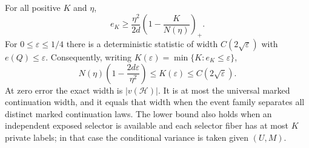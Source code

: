 \begin{theorem}\label{thm:v15-task}
For all positive $K$ and $\eta$,
\begin{equation}\label{eq:v15-task-packing}
 e_K\ge\frac{\eta^2}{2d}\left(1-\frac K{N(\eta)}\right)_+.
\end{equation}
For $0\le\varepsilon\le1/4$ there is a deterministic statistic of
width $C(2\sqrt\varepsilon)$ with $e(Q)\le\varepsilon$. Consequently,
writing $K(\varepsilon)=\min\{K:e_K\le\varepsilon\}$,
\begin{equation}\label{eq:v15-task-width}
 N(\eta)\left(1-\frac{2d\varepsilon}{\eta^2}\right)
       \le K(\varepsilon)\le C(2\sqrt\varepsilon).
\end{equation}
At zero error the exact width is $|v(\mathcal H)|$. It is at most the
universal marked continuation width, and it equals that width when
the event family separates all distinct marked continuation laws.
The lower bound also holds when an independent exposed selector is
available and each selector fiber has at most $K$ private labels;
in that case the conditional variance is taken given $(U,M)$.
\end{theorem}
